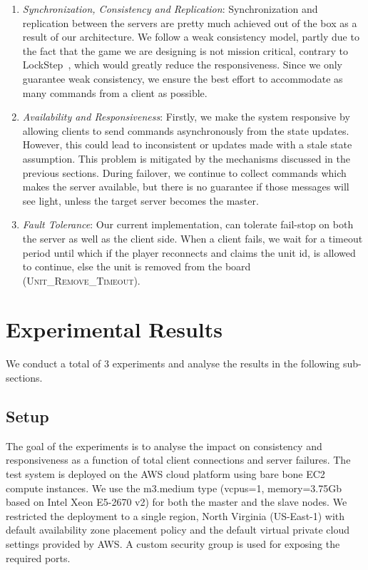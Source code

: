 \documentclass[a4paper]{IEEEtran}
\begin{document}
  \begin{enumerate}
    \item \emph{Synchronization, Consistency and Replication}: Synchronization and replication between the servers are pretty much achieved out of the box as a result of our architecture. We follow a weak consistency model, partly due to the fact that the game we are designing is not mission critical, contrary to LockStep~\cite{funkhouser1995ring}, which would greatly reduce the responsiveness. Since we only guarantee weak consistency, we ensure the best effort to accommodate as many commands from a client as possible.

    \item \emph{Availability and Responsiveness}: Firstly, we make the system responsive by allowing clients to send commands asynchronously from the state updates. However, this could lead to inconsistent or updates made with a stale state assumption. This problem is mitigated by the mechanisms discussed in the previous sections. During failover, we continue to collect commands which makes the server available, but there is no guarantee if those messages will see light, unless the target server becomes the master.
  
    \item \emph{Fault Tolerance}: Our current implementation, can tolerate fail-stop on both the server as well as the client side. When a client fails, we wait for a timeout period until which if the player reconnects and claims the unit id, is allowed to continue, else the unit is removed from the board (\textsc{Unit\_Remove\_Timeout}).

  \end{enumerate}
  
  \section{Experimental Results} \label{experiments}
  
  We conduct a total of 3 experiments and analyse the results in the following sub-sections.
  
  \subsection{Setup}
  
  The goal of the experiments is to analyse the impact on consistency and responsiveness as a function of total client connections and server failures. The test system is deployed on the AWS cloud platform using bare bone EC2 compute instances. We use the m3.medium type (vcpus=1, memory=3.75Gb based on Intel Xeon E5-2670 v2) for both the master and the slave nodes. We restricted the deployment to a single region, North Virginia (US-East-1) with default availability zone placement policy and the default virtual private cloud settings provided by AWS. A custom security group is used for exposing the required ports.
\end{document}
